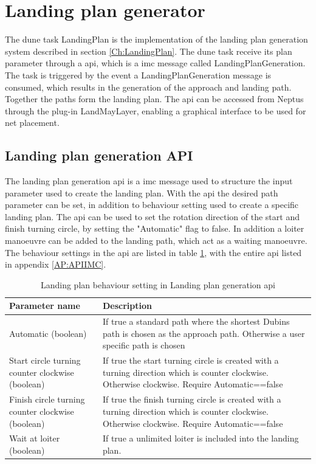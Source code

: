 \section{Landing plan generator}
The \gls{dune} task LandingPlan is the implementation of the landing plan generation system described in section \ref{Ch:LandingPlan}. The \gls{dune} task receive its plan parameter through a \acrfull{api}, which is a \gls{imc} message called LandingPlanGeneration. The task is triggered by the event a LandingPlanGeneration message is consumed, which results in the generation of the approach and landing path. Together the paths form the landing plan. The \gls{api} can be accessed from Neptus through the plug-in LandMayLayer, enabling a graphical interface to be used for net placement.
\subsection{Landing plan generation API}
The landing plan generation \acrfull{api} is a \gls{imc} message used to structure the input parameter used to create the landing plan. With the \gls{api} the desired path parameter can be set, in addition to behaviour setting used to create a specific landing plan. The \gls{api} can be used to set the rotation direction of the start and finish turning circle, by setting the "Automatic" flag to false. In addition a loiter manoeuvre can be added to the landing path, which act as a waiting manoeuvre. The behaviour settings in the \gls{api} are listed in table \ref{Tb:DubinConfig}, with the entire \gls{api} listed in appendix \ref{AP:APIIMC}.
\newpage
\begin{table}[H]
\centering
\begin{tabular}{| p{2.7cm} | p{6cm} |}
\hline
\textbf{Parameter name} 							& \textbf{Description} \\ \hline
 Automatic (boolean)								& If true a standard path where the shortest Dubins path is chosen as the approach path. Otherwise a user specific path is chosen \\ \hline
Start circle turning counter clockwise (boolean)	& If true the start turning circle is created with a turning direction which is counter clockwise. Otherwise clockwise. Require Automatic==false \\ \hline
Finish circle turning counter clockwise (boolean)	& If true the finish turning circle is created with a turning direction which is counter clockwise. Otherwise clockwise. Require Automatic==false \\ \hline
Wait at loiter (boolean)							& If true a unlimited loiter is included into the landing plan. \\ \hline

\end{tabular}
\caption{Landing plan behaviour setting in Landing plan generation \gls{api}}
\label{Tb:DubinConfig}
\end{table}
